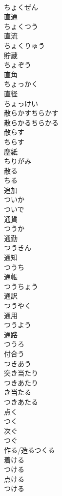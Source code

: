 \documentclass[8pt]{extreport}
\begin{document}
\begin{CJK}{UTF8}{min}
\\	ちょくぜん	
\\	直通 
\\	ちょくつう	
\\	直流 
\\	ちょくりゅう	
\\	貯蔵 
\\	ちょぞう	
\\	直角 
\\	ちょっかく	
\\	直径 
\\	ちょっけい	
\\	散らかすちらかす	
\\	散らかるちらかる	
\\	散らす 
\\	ちらす	
\\	塵紙 
\\	ちりがみ	
\\	散る 
\\	ちる	
\\	追加 
\\	ついか	
\\	ついで	
\\	通貨 
\\	つうか	
\\	通勤 
\\	つうきん	
\\	通知 
\\	つうち	
\\	通帳 
\\	つうちょう	
\\	通訳 
\\	つうやく	
\\	通用 
\\	つうよう	
\\	通路 
\\	つうろ	
\\	付合う 
\\	つきあう	
\\	突き当たり 
\\	つきあたり	
\\	き当たる 
\\	つきあたる	
\\	点く 
\\	つく	
\\	次ぐ 
\\	つぐ	
\\	作る/造るつくる	
\\	着ける 
\\	つける	
\\	点ける 
\\	つける	

\end{CJK}
\end{document}
